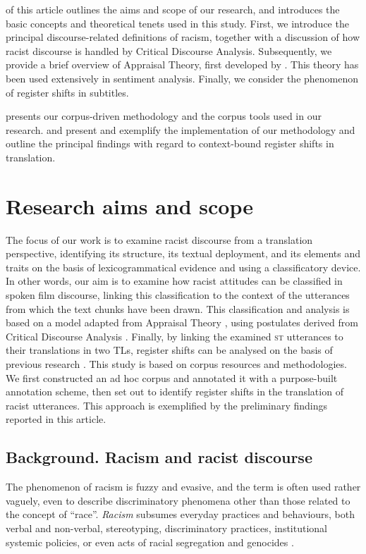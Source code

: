 \documentclass[output=paper]{LSP/langsci}
\begin{document}
 of this article outlines the aims and scope of our research, and introduces the basic concepts and theoretical tenets used in this study. First, we introduce the principal discourse-related definitions of racism, together with a discussion of how racist discourse is handled by Critical Discourse Analysis. Subsequently, we provide a brief overview of Appraisal Theory, first developed by \citet{MartinWhite2005}. This theory has been used extensively in sentiment analysis. Finally, we consider the phenomenon of register shifts in subtitles.

 presents our corpus-driven methodology and the corpus tools used in our research.  and  present and exemplify the implementation of our methodology and outline the principal findings with regard to context-bound register shifts in translation.

\section{Research aims and scope} \label{sec:2:2}
The focus of our work is to examine racist discourse from a translation perspective, identifying its structure, its textual deployment, and its elements and traits on the basis of lexicogrammatical evidence and using a classificatory device. In other words, our aim is to examine how racist attitudes can be classified in spoken film discourse, linking this classification to the context of the utterances from which the text chunks have been drawn. This classification and analysis is based on a model adapted from Appraisal Theory \citep{MartinWhite2005}, using postulates derived from Critical Discourse Analysis \citep{Reisigl2001,Dijk2000a,Dijk2000b,Dijk2002}. Finally, by linking the examined \textsc{st} utterances to their translations in two TLs, register shifts can be analysed on the basis of previous research \citep{Hatim1997, Mason2001, Pettit2005, Mubenga2009, Munday2012}.
This study is based on corpus resources and methodologies. We first constructed an ad hoc corpus and annotated it with a purpose-built annotation scheme, then set out to identify register shifts in the translation of racist utterances. This approach is exemplified by the preliminary findings reported in this article.

\subsection{Background. Racism and racist discourse} \label{sec:2:2:1}
The phenomenon of racism is fuzzy and evasive, and the term is often used rather vaguely, even to describe discriminatory phenomena other than those related to the concept of “race”. \textit{Racism} subsumes everyday practices and behaviours, both verbal and non-verbal, stereotyping, discriminatory practices, institutional systemic policies, or even acts of racial segregation and genocides \citep[637--653]{Giddens2009}.
\end{document}

